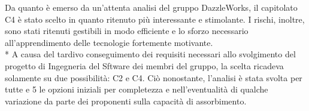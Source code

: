 Da quanto è emerso da un’attenta analisi del gruppo DazzleWorks, il capitolato C4 è stato scelto in quanto ritenuto più interessante e stimolante. I rischi, inoltre, sono stati ritenuti gestibili in modo efficiente e lo sforzo necessario all’apprendimento delle tecnologie fortemente motivante. \\* A causa del tardivo conseguimento dei requisiti necessari allo svolgimento del progetto di Ingegneria del Sftware dei membri del gruppo, la scelta ricadeva solamente su due possibilità: C2 e C4. Ciò nonostante, l'analisi è stata svolta per tutte e 5 le opzioni iniziali per completezza e nell’eventualità di qualche variazione da parte dei proponenti sulla capacità di assorbimento.
